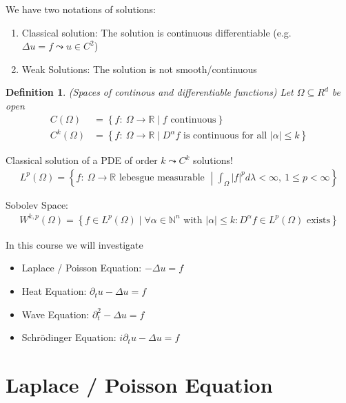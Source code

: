 \documentclass{report}
\theoremstyle{tommy}
\newtheorem{defn}{Definition}
\begin{document}
  We have two notations of solutions:
  \begin{enumerate}
    \item Classical solution: The solution is continuous differentiable (e.g. \( \Delta u = f  \leadsto u \in C^2  \))
    \item Weak Solutions: The solution is not smooth/continuous
  \end{enumerate}

  \begin{defn} (Spaces of continous and differentiable functions)
    Let \(\Omega \subseteq R^d\) be open
    \begin{align*}
      C(\Omega) &= \left\{ f: \ \Omega \to \mathbb{R} \mid f \text{ continuous} \right\} \\
      C^k(\Omega) &= \left\{ f: \ \Omega \to \mathbb{R} \mid D^\alpha f \text{ is continuous for all } |\alpha| \le k \right\}
    \end{align*}
  \end{defn}

  Classical solution of a PDE of order \(k \leadsto C^k\) solutions!
  \begin{align*}
    L^p(\Omega) = \left\{ f: \ \Omega \to \mathbb{R} \text{ lebesgue measurable } \middle| \int_\Omega |f|^p d\lambda < \infty,\ 1 \le p < \infty \right\}
  \end{align*}

  Sobolev Space:
  \begin{align*}
    W^{k,p}(\Omega)= \left \{ f \in L^p(\Omega) \mid \forall \alpha \in \mathbb{N}^n \text{ with } |\alpha| \leq k: D^{\alpha}f \in L^p(\Omega) \text{ exists}  \right \}
  \end{align*}

  In this course we will investigate
  \begin{itemize}
    \item Laplace / Poisson Equation: \(-\Delta u = f\)
    \item Heat Equation: \(\partial_t u - \Delta u = f\)
    \item Wave Equation: \(\partial_t^2 - \Delta u = f\)
    \item Schrödinger Equation: \(i \partial_t u - \Delta u = f\)
  \end{itemize}


  \chapter{Laplace / Poisson Equation}
\end{document}
